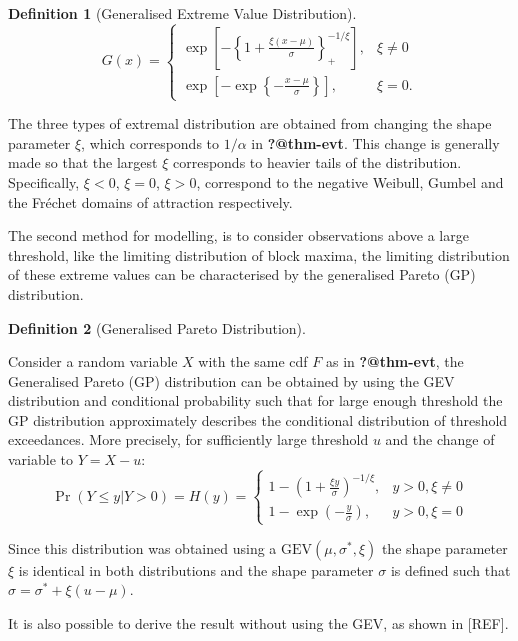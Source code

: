 \documentclass[
  10pt,
  a4paper,
]{scrreprt}
\theoremstyle{definition}
\newtheorem{definition}{Definition}[section]
\theoremstyle{plain}
\theoremstyle{plain}
\theoremstyle{plain}
\theoremstyle{remark}
\begin{document}
{\begin{definition}[Generalised Extreme Value
Distribution]
\[
G(x) = \begin{cases}\exp\left[-\left\{1+\displaystyle\frac{\xi(x-\mu)}{\sigma}\right\}_+^{-1/\xi}\right],&\xi\ne0\\
\exp\left[-\exp\left\{-\displaystyle\frac{x-\mu}{\sigma}\right\}\right],&\xi=0.
\end{cases}
\]

\end{definition}

The three types of extremal distribution are obtained from changing the
shape parameter \(\xi\), which corresponds to \(1/\alpha\) in
\textbf{?@thm-evt}. This change is generally made so that the largest
\(\xi\) corresponds to heavier tails of the distribution. Specifically,
\(\xi<0\), \(\xi=0\), \(\xi>0\), correspond to the negative Weibull,
Gumbel and the Fréchet domains of attraction respectively.

The second method for modelling, is to consider observations above a
large threshold, like the limiting distribution of block maxima, the
limiting distribution of these extreme values can be characterised by
the generalised Pareto (GP) distribution.

\begin{definition}[Generalised Pareto
Distribution]\protect\hypertarget{def-gp}{}\label{def-gp}

Consider a random variable \(X\) with the same cdf \(F\) as in
\textbf{?@thm-evt}, the Generalised Pareto (GP) distribution can be
obtained by using the GEV distribution and conditional probability such
that for large enough threshold the GP distribution approximately
describes the conditional distribution of threshold exceedances. More
precisely, for sufficiently large threshold \(u\) and the change of
variable to \(Y=X-u\): \[
\Pr(Y\le y | Y>0) = H(y) = \begin{cases}
1-\left(1+\displaystyle\frac{\xi y}{\sigma}\right)^{-1/\xi},&y>0,\xi\ne 0 \\
1-\exp\left(-\displaystyle\frac{y}{\sigma}\right),&y>0,\xi = 0
\end{cases}
\]

\end{definition}

Since this distribution was obtained using a
\(\text{GEV}(\mu,\sigma^*,\xi)\) the shape parameter \(\xi\) is
identical in both distributions and the shape parameter \(\sigma\) is
defined such that \(\sigma = \sigma^* + \xi(u-\mu)\).

It is also possible to derive the result without using the GEV, as shown
in {[}REF{]}.

}
\end{document}
